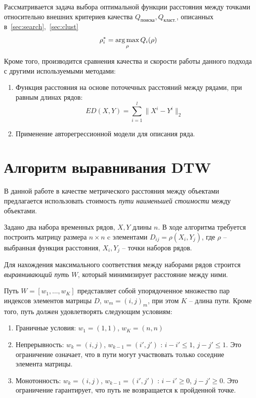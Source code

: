 \documentclass[12pt,twoside]{article}
\begin{document}
        Рассматривается задача выбора оптимальной функции расстояния  между точками относительно внешних критериев качества $Q_\text{поиска}, Q_\text{класт.}$, описанных в~\ref{sec:search},~\ref{sec:clust}
        $$\rho_i^* = \argmax_\rho Q_i(\rho)$$
    
        
        Кроме того, производится сравнения качества и скорости работы данного подхода с другими используемыми методами:
        \begin{enumerate}[label=\arabic*)]
            \item Функция расстояния на основе поточечных расстояний между рядами, при равным длинах рядов:
                $$
                    ED(X, Y) = \sum\limits_{i=1}^l \|X^i - Y^i\|_2
                $$

            \item Применение авторегрессионной модели для описания ряда.
        \end{enumerate}
    
    \label{sec:dtw}\section{Алгоритм выравнивания DTW}

        В данной работе в качестве метрического расстояния между объектами предлагается использовать стоимость
        \textit{пути наименьшей стоимости} между объектами.
 
        Задано два набора временных рядов, $X, Y$ длины $n$.
        В ходе алгоритма требуется построить матрицу размера $n\times n$ c элементами $D_{ij}=\rho(X_i, Y_j)$, где $\rho$ \--- выбранная функция расстояния, $X_i, Y_j$ \--- точки наборов рядов.
        
        Для нахождения максимального соответствия между наборами рядов строится \textit{выравнивающий путь} $W$, который минимизирует расстояние между ними.
        \begin{Def}{}
             Путь $W = [w_1,\dots, w_K]$ представляет собой упорядоченное множество пар индексов элементов матрицы $D$, $w_m = (i, j)_m$, при этом $K$ \--- длина пути. Кроме того, путь должен удовлетворять следующим условиям:
                \begin{enumerate}[label=\arabic*)]
                    \item Граничные условия: $w_1=(1,1)$, $w_K=(n, n)$
                    \item Непрерывность: $w_k = (i, j)$, $w_{k-1}=(i', j')$ : $i-i' \leq 1$, $j-j' \leq 1$. Это ограничение означает, что в пути могут участвовать только соседние элемента матрицы.
                    \item Монотонность: $w_k = (i, j)$, $w_{k-1}=(i', j')$ : $i-i' \geq 0$, $j-j'\geq 0$. Это ограничение гарантирует, что путь не возвращается к пройденной точке.
                \end{enumerate}
        \end{Def}
        
\end{document}
